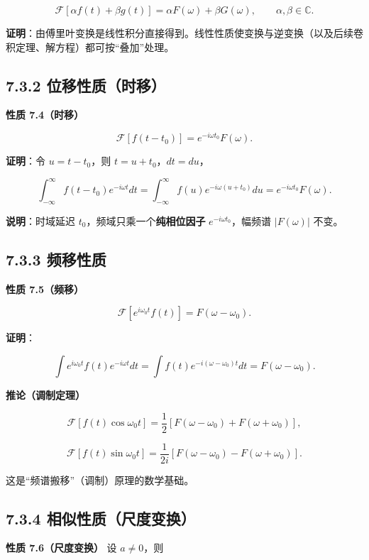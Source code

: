\[
\mathcal F[\alpha f(t)+\beta g(t)]=\alpha F(\omega)+\beta G(\omega),
\qquad \alpha,\beta\in\mathbb C .
\]

\textbf{证明}：由傅里叶变换是线性积分直接得到。线性性质使变换与逆变换（以及后续卷积定理、解方程）都可按``叠加''处理。

\subsection{7.3.2
位移性质（时移）}\label{ux4f4dux79fbux6027ux8d28ux65f6ux79fb}

\textbf{性质 7.4（时移）}

\[
\mathcal F[f(t-t_0)]=e^{-i\omega t_0}F(\omega).
\]

\textbf{证明}：令 \(u=t-t_0\)，则 \(t=u+t_0\)，\(dt=du\)，

\[
\int_{-\infty}^{\infty}f(t-t_0)e^{-i\omega t}dt
=\int_{-\infty}^{\infty}f(u)e^{-i\omega(u+t_0)}du
=e^{-i\omega t_0}F(\omega).
\]

\textbf{说明}：时域延迟 \(t_0\)，频域只乘一个\textbf{纯相位因子}
\(e^{-i\omega t_0}\)，幅频谱 \(|F(\omega)|\) 不变。

\subsection{7.3.3 频移性质}\label{ux9891ux79fbux6027ux8d28}

\textbf{性质 7.5（频移）}

\[
\mathcal F\left[e^{i\omega_0 t}f(t)\right]=F(\omega-\omega_0).
\]

\textbf{证明}：

\[
\int e^{i\omega_0 t}f(t)e^{-i\omega t}dt
=\int f(t)e^{-i(\omega-\omega_0)t}dt=F(\omega-\omega_0).
\]

\textbf{推论（调制定理）}

\[
\mathcal F[f(t)\cos\omega_0 t]=\frac{1}{2}\left[F(\omega-\omega_0)+F(\omega+\omega_0)\right],
\]

\[
\mathcal F[f(t)\sin\omega_0 t]=\frac{1}{2i}\left[F(\omega-\omega_0)-F(\omega+\omega_0)\right].
\]

这是``频谱搬移''（调制）原理的数学基础。

\subsection{7.3.4
相似性质（尺度变换）}\label{ux76f8ux4f3cux6027ux8d28ux5c3aux5ea6ux53d8ux6362}

\textbf{性质 7.6（尺度变换）} 设 \(a\neq 0\)，则

